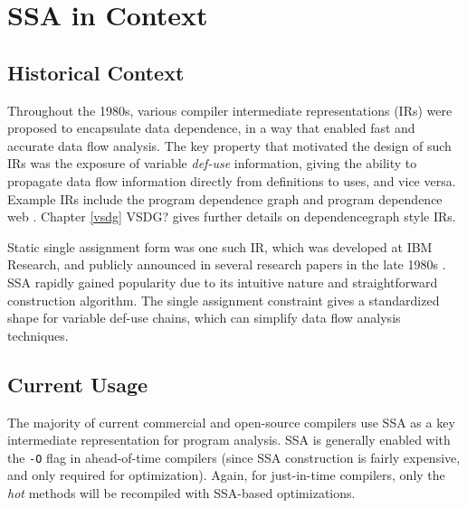 
\section{SSA in Context}




\subsection{Historical Context}

Throughout the 1980s, various compiler intermediate
representations (IRs) were proposed to encapsulate data
dependence, in a way that enabled fast and accurate
data flow analysis.
The key property that motivated the design of
such IRs was the exposure of variable \textit{def-use} 
information, giving the ability
to propagate data flow information directly
from definitions to uses,
and vice versa.
Example IRs include the program dependence graph \cite{ferrante87program}
and program dependence web \cite{ottenstein90program}.
Chapter \ref{vsdg} VSDG? gives further details on dependencegraph
style IRs.


Static single assignment form was one such IR, 
which was developed at IBM Research, and publicly announced
in several research papers in the late 1980s
\cite{rosen88global,alpern88detecting,cytron89efficient}.
SSA rapidly gained popularity due to its 
intuitive nature and straightforward
construction algorithm.
The single assignment constraint gives a 
standardized shape for variable def-use chains,
which can simplify data flow analysis techniques.

\subsection{Current Usage}

The majority of current commercial and open-source compilers
use SSA as a key intermediate representation for
program analysis.
SSA is generally enabled with the \texttt{-O}
flag in ahead-of-time compilers (since SSA construction
is fairly expensive, and only required for optimization).
Again, for just-in-time compilers, only the \textit{hot} 
methods will be recompiled with SSA-based optimizations.

